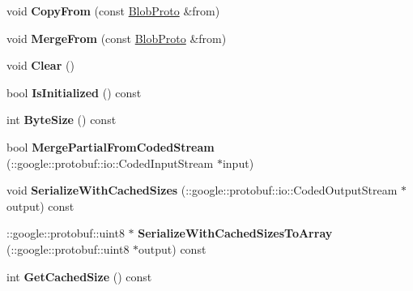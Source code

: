 \begin{DoxyCompactItemize}
\item 
\mbox{\label{classcaffe_1_1_blob_proto_a400e1a5db5268bffe51a48abb46390f0}} 
void {\bfseries Copy\+From} (const \mbox{\hyperlink{classcaffe_1_1_blob_proto}{Blob\+Proto}} \&from)
\item 
\mbox{\label{classcaffe_1_1_blob_proto_a2036cc566f48e8f194a6a1fc1f47a3f5}} 
void {\bfseries Merge\+From} (const \mbox{\hyperlink{classcaffe_1_1_blob_proto}{Blob\+Proto}} \&from)
\item 
\mbox{\label{classcaffe_1_1_blob_proto_a5b5a9101dd8e3a0b024d8f904c9260d2}} 
void {\bfseries Clear} ()
\item 
\mbox{\label{classcaffe_1_1_blob_proto_abef9f604a7d77b58ae0e3df80ac9d54d}} 
bool {\bfseries Is\+Initialized} () const
\item 
\mbox{\label{classcaffe_1_1_blob_proto_a6d9fc09ab3716be0c2c1c69783d405fa}} 
int {\bfseries Byte\+Size} () const
\item 
\mbox{\label{classcaffe_1_1_blob_proto_a2bcb7a7c77e7ea39ecd8dbf7d8ac4bce}} 
bool {\bfseries Merge\+Partial\+From\+Coded\+Stream} (\+::google\+::protobuf\+::io\+::\+Coded\+Input\+Stream $\ast$input)
\item 
\mbox{\label{classcaffe_1_1_blob_proto_a00448161800f3378d4e0c6c13ab71c6f}} 
void {\bfseries Serialize\+With\+Cached\+Sizes} (\+::google\+::protobuf\+::io\+::\+Coded\+Output\+Stream $\ast$output) const
\item 
\mbox{\label{classcaffe_1_1_blob_proto_af057c90bb25be723ad4554fb87a76c53}} 
\+::google\+::protobuf\+::uint8 $\ast$ {\bfseries Serialize\+With\+Cached\+Sizes\+To\+Array} (\+::google\+::protobuf\+::uint8 $\ast$output) const
\item 
\mbox{\label{classcaffe_1_1_blob_proto_a11d1e9ed06b1ab948959e6a6326609d7}} 
int {\bfseries Get\+Cached\+Size} () const
\item 
\mbox{\label{classcaffe_1_1_blob_proto_a47a60de7cf5399260412c597f08dc358}} 

\end{DoxyCompactItemize}
